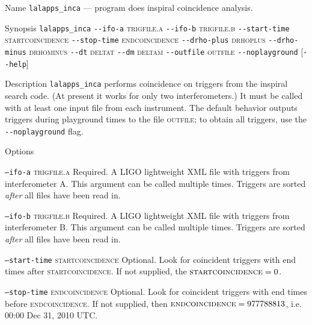 \begin{entry}
\item[Name]
\verb$lalapps_inca$ --- program does inspiral coincidence analysis.

\item[Synopsis]
\verb$lalapps_inca$ 
\verb$--ifo-a$ \textsc{trigfile.a} \verb$--ifo-b$ \textsc{trigfile.b} 
\verb$--start-time$ \textsc{startcoincidence} \verb$--stop-time$ \textsc{endcoincidence} 
\verb$--drho-plus$ \textsc{drhoplus} \verb$--drho-minus$ \textsc{drhominus} 
\verb$--dt$ \textsc{deltat} \verb$--dm$ \textsc{deltam} 
\verb$--outfile$ \textsc{outfile} \verb$--noplayground$ 
[\verb$--help$]

\item[Description] 
\verb$lalapps_inca$ performs coincidence on triggers from the inspiral
search code.  (At present it works for only two interferometers.) It
must be called with at least one input file from each instrument. The
default behavior outputs triggers during playground times to the file
\textsc{outfile};  to obtain all triggers,  use the
\verb$--noplayground$ flag.     

\item[Options]\leavevmode
\begin{entry}
\item[\texttt{--ifo-a} \textsc{trigfile.a}] Required.  A LIGO lightweight
XML file with triggers from interferometer A.  This argument can be
called multiple times.  Triggers are sorted \emph{after} all files
have been read in. 

\item[\texttt{--ifo-b} \textsc{trigfile.b}] Required.  A LIGO lightweight
XML file with triggers from interferometer B.  This argument can be
called multiple times.  Triggers are sorted \emph{after} all files
have been read in. 

\item[\texttt{--start-time} \textsc{startcoincidence}] Optional.  Look for
coincident triggers with end times after \textsc{startcoincidence}.
If not supplied,  the $\textsc{startcoincidence} = 0$.

\item[\texttt{--stop-time} \textsc{endcoincidence}]  Optional. Look for
coincident triggers with end times before \textsc{endcoincidence}.
If not supplied,  then $\textsc{endcoincidence} = 977788813$, i.e.
00:00 Dec 31, 2010 UTC.


\end{entry}
\end{entry}
